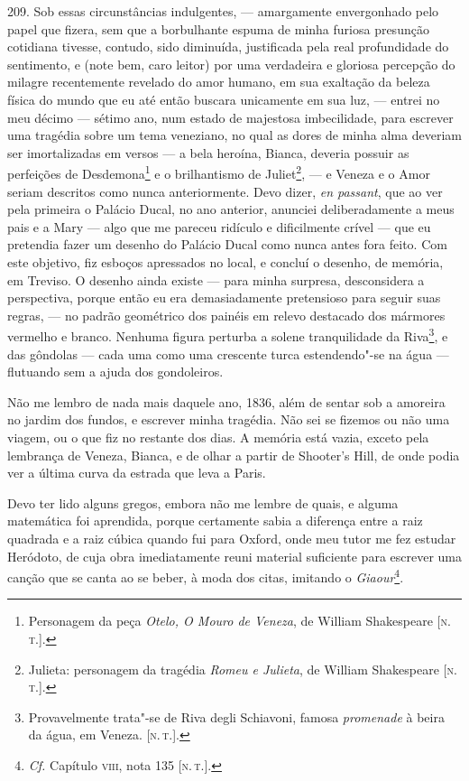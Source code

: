 209. Sob essas circunstâncias indulgentes, --- amargamente envergonhado
pelo papel que fizera, sem que a borbulhante espuma de minha furiosa
presunção cotidiana tivesse, contudo, sido diminuída, justificada pela
real profundidade do sentimento, e (note bem, caro leitor) por uma
verdadeira e gloriosa percepção do milagre recentemente revelado do amor
humano, em sua exaltação da beleza física do mundo que eu até então
buscara unicamente em sua luz, --- entrei no meu décimo --- sétimo ano, num
estado de majestosa imbecilidade, para escrever uma tragédia sobre um
tema veneziano, no qual as dores de minha alma deveriam ser
imortalizadas em versos --- a bela heroína, Bianca, deveria possuir as
perfeições de Desdemona\footnote{Personagem da peça \emph{Otelo, O Mouro
  de Veneza}, de William Shakespeare {[}\textsc{n.\,t.}{]}.} e o brilhantismo
de Juliet\footnote{Julieta: personagem da tragédia \emph{Romeu e
  Julieta}, de William Shakespeare {[}\textsc{n.\,t.}{]}.}, --- e Veneza e o
Amor seriam descritos como nunca anteriormente. Devo dizer, \emph{en
passant}, que ao ver pela primeira o Palácio Ducal, no ano anterior,
anunciei deliberadamente a meus pais e a Mary --- algo que me pareceu
ridículo e dificilmente crível --- que eu pretendia fazer um desenho do
Palácio Ducal como nunca antes fora feito. Com este objetivo, fiz
esboços apressados no local, e concluí o desenho, de memória, em
Treviso. O desenho ainda existe --- para minha surpresa, desconsidera a
perspectiva, porque então eu era demasiadamente pretensioso para seguir
suas regras, --- no padrão geométrico dos painéis em relevo destacado dos
mármores vermelho e branco. Nenhuma figura perturba a solene
tranquilidade da Riva\footnote{Provavelmente trata"-se de Riva degli
  Schiavoni, famosa \emph{promenade} à beira da água, em Veneza. {[}\textsc{n.\,t.}{]}.}, e das gôndolas --- cada uma como uma crescente turca
estendendo"-se na água --- flutuando sem a ajuda dos gondoleiros.

Não me lembro de nada mais daquele ano, 1836, além de sentar sob a
amoreira no jardim dos fundos, e escrever minha tragédia. Não sei se
fizemos ou não uma viagem, ou o que fiz no restante dos dias. A memória
está vazia, exceto pela lembrança de Veneza, Bianca, e de olhar a partir
de Shooter's Hill, de onde podia ver a última curva da estrada que leva
a Paris.

Devo ter lido alguns gregos, embora não me lembre de quais, e alguma
matemática foi aprendida, porque certamente sabia a diferença entre a
raiz quadrada e a raiz cúbica quando fui para Oxford, onde meu tutor me
fez estudar Heródoto, de cuja obra imediatamente reuni material
suficiente para escrever uma canção que se canta ao se beber, à moda dos
citas, imitando o \emph{Giaour}\footnote{\emph{Cf.} Capítulo \textsc{viii}, nota
  135 {[}\textsc{n.\,t.}{]}.}.

